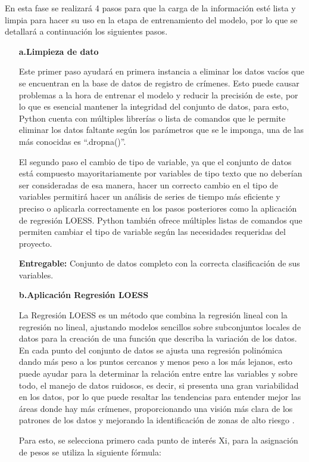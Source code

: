 En esta fase se realizará 4 pasos para que la carga de la información esté lista y limpia para hacer su uso en la etapa de entrenamiento del modelo, por lo que se detallará a continuación los siguientes pasos.

\begin{itemize}
	\item[\textbf{a.Limpieza de dato}]

Este primer paso ayudará en primera instancia a eliminar los datos vacíos que se encuentran en la base de datos de registro de crímenes. Esto puede causar problemas a la hora de entrenar el modelo y reducir la precisión de este, por lo que es esencial mantener la integridad del conjunto de datos, para esto, Python cuenta con múltiples librerías o lista de comandos que le permite eliminar los datos faltante según los parámetros que se le imponga, una de las más conocidas es “.dropna()”.

El segundo paso el cambio de tipo de variable, ya que el conjunto de datos está compuesto mayoritariamente por variables de tipo texto que no deberían ser consideradas de esa manera, hacer un correcto cambio en el tipo de variables permitirá hacer un análisis de series de tiempo más eficiente y preciso o aplicarla correctamente en los pasos posteriores como la aplicación de regresión LOESS.  Python también ofrece múltiples listas de comandos que permiten cambiar el tipo de variable según las necesidades requeridas del proyecto.

\textbf{Entregable:} Conjunto de datos completo con la correcta clasificación de sus variables.
	\item[\textbf{b.Aplicación Regresión LOESS
	}] 
	
La Regresión LOESS	es un método que combina la regresión lineal con la regresión no lineal, ajustando modelos sencillos sobre subconjuntos locales de datos para la creación de una función que describa la variación de los datos. En cada punto del conjunto de datos se ajusta una regresión polinómica dando más peso a los puntos cercanos y menos peso a los más lejanos, esto puede ayudar para la determinar la relación entre entre las variables y sobre todo, el manejo de datos ruidosos, es decir, si presenta una gran variabilidad en los datos, por lo que puede resaltar las tendencias para entender mejor las áreas donde hay más crímenes, proporcionando una visión más clara de los patrones de los datos y mejorando la identificación de zonas de alto riesgo \parencite{gl_maxima}.

Para esto, se selecciona primero cada punto de interés Xi, para la asignación de pesos se utiliza la siguiente fórmula:


\end{itemize}
